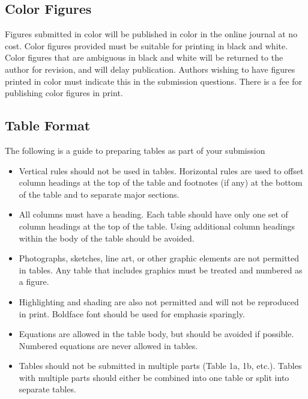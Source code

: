 \documentclass[
  NewProceedings,
  letterpaper]{./assets/ascelike-new}
\begin{document}
\hypertarget{color-figures}{%
\subsection{Color Figures}\label{color-figures}}

Figures submitted in color will be published in color in the online
journal at no cost. Color figures provided must be suitable for printing
in black and white. Color figures that are ambiguous in black and white
will be returned to the author for revision, and will delay publication.
Authors wishing to have figures printed in color must indicate this in
the submission questions. There is a fee for publishing color figures in
print.

\hypertarget{table-format}{%
\subsection{Table Format}\label{table-format}}

The following is a guide to preparing tables as part of your submission

\begin{itemize}
\item
  Vertical rules should not be used in tables. Horizontal rules are used
  to offset column headings at the top of the table and footnotes (if
  any) at the bottom of the table and to separate major sections.
\item
  All columns must have a heading. Each table should have only one set
  of column headings at the top of the table. Using additional column
  headings within the body of the table should be avoided.
\item
  Photographs, sketches, line art, or other graphic elements are not
  permitted in tables. Any table that includes graphics must be treated
  and numbered as a figure.
\item
  Highlighting and shading are also not permitted and will not be
  reproduced in print. Boldface font should be used for emphasis
  sparingly.
\item
  Equations are allowed in the table body, but should be avoided if
  possible. Numbered equations are never allowed in tables.
\item
  Tables should not be submitted in multiple parts (Table 1a, 1b, etc.).
  Tables with multiple parts should either be combined into one table or
  split into separate tables.
\end{itemize}
\end{document}
